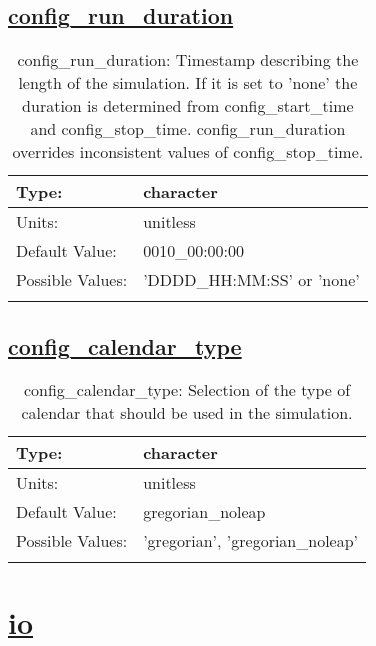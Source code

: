 \subsection[config\_run\_duration]{\hyperref[sec:nm_tab_time_management]{config\_run\_duration}}
\label{subsec:nm_sec_config_run_duration}
\begin{center}
\begin{longtable}{| p{2.0in} || p{4.0in} |}
    \hline
    Type: & character \\
    \hline
    Units: & \si{unitless} \\
    \hline
    Default Value: & 0010\_00:00:00 \\
    \hline
    Possible Values: & 'DDDD\_HH:MM:SS' or 'none' \\
    \hline
    \caption{config\_run\_duration: Timestamp describing the length of the simulation. If it is set to 'none' the duration is determined from config\_start\_time and config\_stop\_time. config\_run\_duration overrides inconsistent values of config\_stop\_time.}
\end{longtable}
\end{center}
\subsection[config\_calendar\_type]{\hyperref[sec:nm_tab_time_management]{config\_calendar\_type}}
\label{subsec:nm_sec_config_calendar_type}
\begin{center}
\begin{longtable}{| p{2.0in} || p{4.0in} |}
    \hline
    Type: & character \\
    \hline
    Units: & \si{unitless} \\
    \hline
    Default Value: & gregorian\_noleap \\
    \hline
    Possible Values: & 'gregorian', 'gregorian\_noleap' \\
    \hline
    \caption{config\_calendar\_type: Selection of the type of calendar that should be used in the simulation.}
\end{longtable}
\end{center}
\section[io]{\hyperref[sec:nm_tab_io]{io}}
\label{sec:nm_sec_io}
